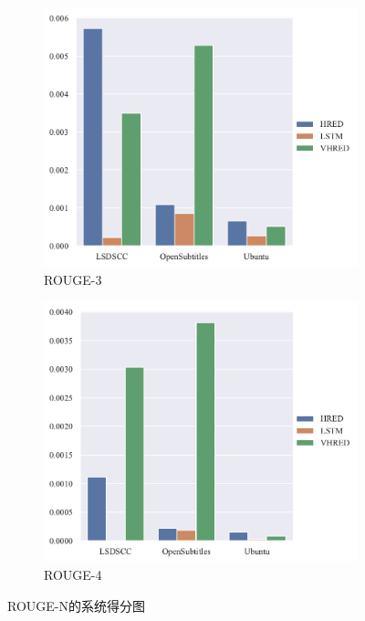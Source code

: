 \begin{figure}[H]
    \begin{subfigure}{0.5\linewidth}
        \centering
        \includegraphics[width=\linewidth]{figure/barplot/rouge_3/plot.pdf}
        \caption{ROUGE-3}
    \end{subfigure}%
    \begin{subfigure}{0.5\linewidth}
        \centering
        \includegraphics[width=\linewidth]{figure/barplot/rouge_4/plot.pdf}
        \caption{ROUGE-4}
    \end{subfigure}
    \centering
    \caption{ROUGE-N的系统得分图}
    \label{fig:ROUGE_N_system}
\end{figure}
